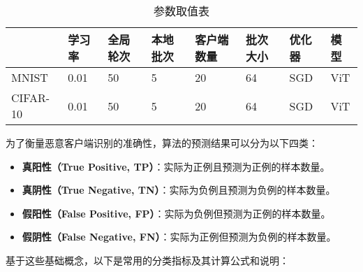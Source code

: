 \documentclass[lettersize,journal]{IEEEtran}
\begin{document}
\begin{table*}[t]  %
\small
\centering
\begin{tabularx}{\textwidth}{|X|X|X|X|X|X|X|X|}  %
\hline
& 学习率 & 全局轮次 & 本地批次 & 客户端数量 & 批次大小 & 优化器 & 模型 \\
\hline
MNIST & 0.01 & 50 & 5 & 20 & 64 & SGD & ViT \\
CIFAR-10 & 0.01 & 50 & 5 & 20 & 64 & SGD & ViT \\
\hline
\end{tabularx}
\caption{参数取值表}
\end{table*}


为了衡量恶意客户端识别的准确性，算法的预测结果可以分为以下四类：

\begin{itemize}
    \item \textbf{真阳性（True Positive, TP）}：实际为正例且预测为正例的样本数量。
    \item \textbf{真阴性（True Negative, TN）}：实际为负例且预测为负例的样本数量。
    \item \textbf{假阳性（False Positive, FP）}：实际为负例但预测为正例的样本数量。
    \item \textbf{假阴性（False Negative, FN）}：实际为正例但预测为负例的样本数量。
\end{itemize}

基于这些基础概念，以下是常用的分类指标及其计算公式和说明：
\end{document}
